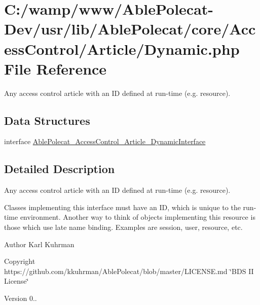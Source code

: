 \hypertarget{_dynamic_8php}{}\section{C\+:/wamp/www/\+Able\+Polecat-\/\+Dev/usr/lib/\+Able\+Polecat/core/\+Access\+Control/\+Article/\+Dynamic.php File Reference}
\label{_dynamic_8php}


Any access control article with an I\+D defined at run-\/time (e.\+g. resource).  


\subsection*{Data Structures}
\begin{DoxyCompactItemize}
\item 
interface \hyperlink{interface_able_polecat___access_control___article___dynamic_interface}{Able\+Polecat\+\_\+\+Access\+Control\+\_\+\+Article\+\_\+\+Dynamic\+Interface}
\end{DoxyCompactItemize}


\subsection{Detailed Description}
Any access control article with an I\+D defined at run-\/time (e.\+g. resource). 

Classes implementing this interface must have an I\+D, which is unique to the run-\/time environment. Another way to think of objects implementing this resource is those which use late name binding. Examples are session, user, resource, etc.

\begin{DoxyAuthor}{Author}
Karl Kuhrman 
\end{DoxyAuthor}
\begin{DoxyCopyright}{Copyright}
https\+://github.com/kkuhrman/\+Able\+Polecat/blob/master/\+L\+I\+C\+E\+N\+S\+E.\+md \char`\"{}\+B\+D\+S I\+I License\char`\"{} 
\end{DoxyCopyright}
\begin{DoxyVersion}{Version}
0.. 
\end{DoxyVersion}
